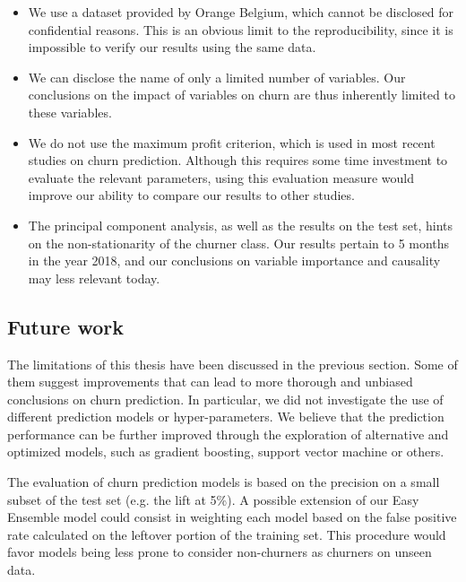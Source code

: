 \begin{itemize}
	\item We use a dataset provided by Orange Belgium, which cannot be disclosed
	for confidential reasons. This is an obvious limit to the reproducibility,
	since it is impossible to verify our results using the same data.

	\item We can disclose the name of only a limited number of variables. Our
	conclusions on the impact of variables on churn are thus inherently limited
	to these variables.

	\item We do not use the maximum profit criterion, which is used in most
	recent studies on churn prediction. Although this requires some time
	investment to evaluate the relevant parameters, using this evaluation
	measure would improve our ability to compare our results to other studies.

	\item The principal component analysis, as well as the results on the test
	set, hints on the non-stationarity of the churner class. Our results pertain
	to 5 months in the year 2018, and our conclusions on variable importance and
	causality may less relevant today.

\end{itemize}

\subsection{Future work}

The limitations of this thesis have been discussed in the previous section. Some
of them suggest improvements that can lead to more thorough and unbiased
conclusions on churn prediction. In particular, we did not investigate the use
of different prediction models or hyper-parameters. We believe that the
prediction performance can be further improved through the exploration of
alternative and optimized models, such as gradient boosting, support vector
machine or others.

The evaluation of churn prediction models is based on the precision on a small
subset of the test set (e.g. the lift at 5\%). A possible extension of our Easy
Ensemble model could consist in weighting each model based on the false positive
rate calculated on the leftover portion of the training set. This procedure
would favor models being less prone to consider non-churners as churners on
unseen data.

